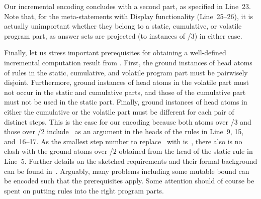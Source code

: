 Our incremental encoding concludes with a second  part,
as specified in Line~23.
Note that, for the meta-statements with Display functionality (Line~25--26),
it is actually unimportant whether they belong to a static, cumulative, or
volatile program part, as answer sets are projected
(to instances of /$3$) in either case.
%

Finally, let us stress important prerequisites for obtaining
a well-defined incremental computation result from \clingo.
First, the ground instances of head atoms of rules in the
static, cumulative, and volatile program part must be pairwisely disjoint.
Furthermore, ground instances of head atoms in the volatile part
must not occur in the static and cumulative parts,
and those of the cumulative part must not be used in the static part.
Finally, ground instances of head atoms in either the cumulative or the volatile part
must be different for each pair of distinct steps.
This is the case for our encoding because both atoms over /$3$
and those over \pred{holds}/$2$ include~\const{t} as an argument in the
heads of the rules in Line~9, 15, and~16--17.
As the smallest step number to replace~ with is~,
there also is no clash with the ground atoms over \pred{holds}/$2$
obtained from the head of the static rule in Line~5.
Further details on the sketched requirements and their formal background can
be found in~\cite{gekakaosscth08a}.
Arguably, many problems including some mutable bound can be encoded
such that the prerequisites apply.
Some attention should of course be spent on
putting rules into the right program parts.


